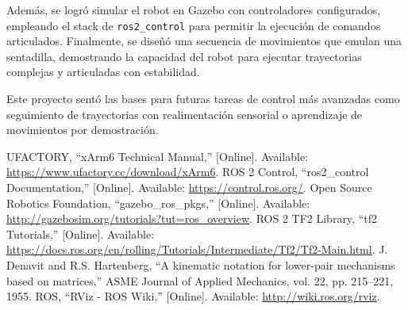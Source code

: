 \documentclass[conference]{IEEEtran}
\begin{document}
Además, se logró simular el robot en Gazebo con controladores configurados, empleando el stack de \texttt{ros2\_control} para permitir la ejecución de comandos articulados. Finalmente, se diseñó una secuencia de movimientos que emulan una sentadilla, demostrando la capacidad del robot para ejecutar trayectorias complejas y articuladas con estabilidad.

Este proyecto sentó las bases para futuras tareas de control más avanzadas como seguimiento de trayectorias con realimentación sensorial o aprendizaje de movimientos por demostración.

\begin{thebibliography}{00}
 UFACTORY, “xArm6 Technical Manual,” [Online]. Available: \url{https://www.ufactory.cc/download/xArm6}.
 ROS 2 Control, “ros2\_control Documentation,” [Online]. Available: \url{https://control.ros.org/}.
 Open Source Robotics Foundation, “gazebo\_ros\_pkgs,” [Online]. Available: \url{http://gazebosim.org/tutorials?tut=ros_overview}.
 ROS 2 TF2 Library, “tf2 Tutorials,” [Online]. Available: \url{https://docs.ros.org/en/rolling/Tutorials/Intermediate/Tf2/Tf2-Main.html}.
 J. Denavit and R.S. Hartenberg, “A kinematic notation for lower-pair mechanisms based on matrices,” ASME Journal of Applied Mechanics, vol. 22, pp. 215–221, 1955.
 ROS, “RViz - ROS Wiki,” [Online]. Available: \url{http://wiki.ros.org/rviz}.
\end{thebibliography}
\end{document}
